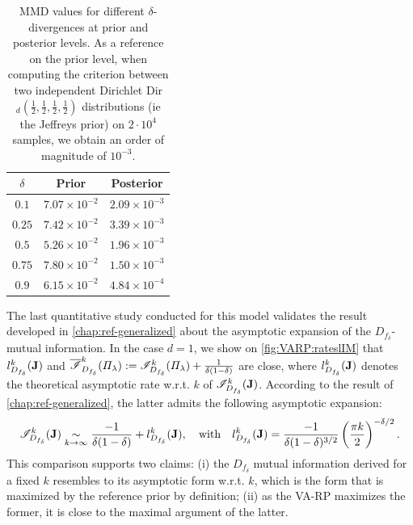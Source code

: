 \begin{table}[h]
\centering
\setlength{\arrayrulewidth}{1.5pt}
\begin{tabular}{|c|c|c|}
\hline
$\delta$ & \textbf{Prior} & \textbf{Posterior}  \\ \hline\hline
$0.1$ & $7.07 \times 10^{-2}$ &  $2.09 \times 10^{-3}$ \\ \hline
$0.25$  & $7.42 \times 10^{-2}$  & $3.39 \times 10^{-3}$  \\ \hline
$0.5$ & $5.26 \times 10^{-2}$ &  $1.96 \times 10^{-3}$   \\ \hline
$0.75$ & $7.80 \times 10^{-2}$ & $1.50 \times 10^{-3}$  \\ \hline 
$0.9$ & $6.15 \times 10^{-2}$ & $4.84 \times 10^{-4}$  \\ \hline 
\end{tabular}
\caption{MMD values for different $\delta$-divergences at prior and posterior levels. As a reference on the prior level, when computing the criterion between two independent Dirichlet Dir$_d(\frac{1}{2},\frac{1}{2},\frac{1}{2},\frac{1}{2})$ distributions (ie the Jeffreys prior) on $2 \cdot 10^4$ samples, we obtain an order of magnitude of $10^{-3}$.}
\label{tab:mmd_multinom}
\end{table}





The last quantitative study conducted for this model validates the result developed in \cref{chap:ref-generalized} about the asymptotic expansion of the $D_{f_\delta}$-mutual information. 
In the case $d=1$, we show on \cref{fig:VARP:rateslIM} that $l_{D_{f_\delta}}^k(\mathbf{J})$ and $\overline{\mathscr{I}}^k_{D_{f_\delta}}(\varPi_\lambda):=\mathscr{I}^k_{D_{f_\delta}}(\varPi_\lambda)+\frac{1}{\delta(1-\delta)}$ are close, where $l^k_{D_{f_\delta}}(\mathbf{J})$ denotes
the theoretical asymptotic rate w.r.t. $k$ of 
$\mathscr{I}^k_{D_{f_\delta}}(\mathbf{J})$. According to the result of \cref{chap:ref-generalized}, the latter admits the following asymptotic expansion:
    \begin{equation}
        \mathscr{I}^k_{D_{f_\delta}}(\mathbf{J}) \underset{k\rightarrow\infty}{\sim} \frac{-1}{\delta(1-\delta)} + l^k_{D_{f_\delta}}(\mathbf{J}), \quad \text{with} \quad l^k_{D_{f_\delta}}(\mathbf{J}) = \frac{-1}{\delta(1-\delta)^{3/2}}\left( \frac{\pi k}{2} \right)^{-\delta/2}.
    \end{equation}
This comparison
supports two claims: (i) the $D_{f_\delta}$ mutual information derived for a fixed $k$ resembles to its asymptotic form w.r.t. $k$, which is the form that is maximized by the reference prior by definition; (ii) as the VA-RP maximizes the former, it is close to the maximal argument of the latter. 


